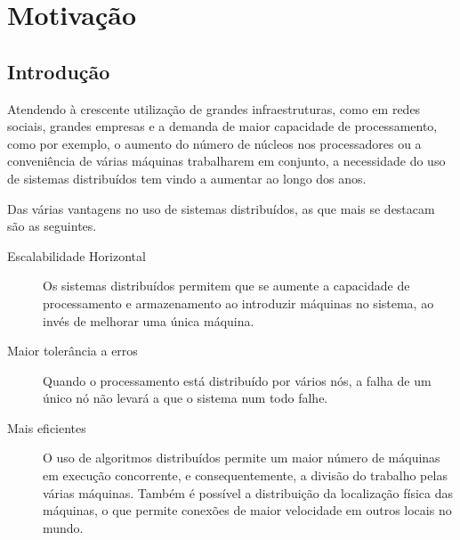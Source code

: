\chapter{Motivação}
\label{chap:estado-da-arte}

\section{Introdução}
\label{chap2:sec:intro}



Atendendo à crescente utilização de grandes infraestruturas, como em redes sociais, grandes empresas e a demanda de maior capacidade de processamento, como por exemplo, o aumento do número de núcleos nos processadores ou a conveniência de várias máquinas trabalharem em conjunto, a necessidade do uso de sistemas distribuídos tem vindo a aumentar ao longo dos anos.

Das várias vantagens no uso de sistemas distribuídos, as que mais se destacam são as seguintes.
\begin{description}
    \item [Escalabilidade Horizontal] Os sistemas distribuídos permitem que se aumente a capacidade de processamento e armazenamento ao introduzir máquinas no sistema, ao invés de melhorar uma única máquina.
	
    \item [Maior tolerância a erros]Quando o processamento está distribuído por vários nós, a falha de um único nó não levará a que o sistema num todo falhe.

    \item [Mais eficientes] O uso de algoritmos distribuídos permite um maior número de máquinas em execução concorrente, e consequentemente, a divisão do trabalho pelas várias máquinas.
	Também é possível a distribuição da localização física das máquinas, o que permite conexões de maior velocidade em outros locais no mundo.

\end{description}

